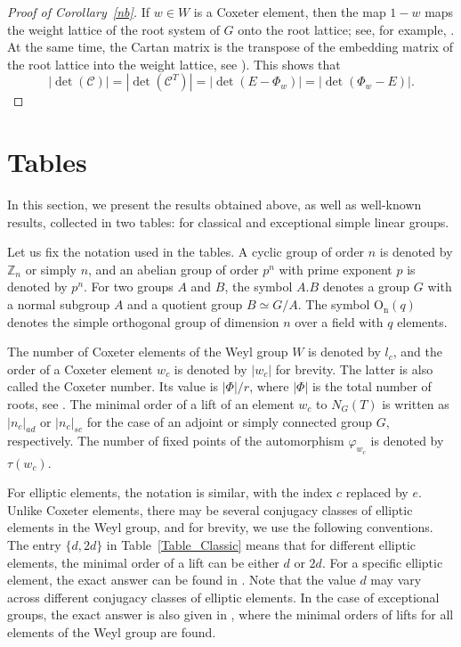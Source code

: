 \documentclass[a4paper,12pt]{amsart}
\theoremstyle{plain}
\theoremstyle{definition}
\begin{document}
\begin{proof}[Proof of Corollary~\ref{nb}]
If $w\in W$ is a Coxeter element, then the map $1-w$ maps the weight lattice of the root system of $G$ onto the root lattice; see, for example, \cite[(VI)$\S$1, ex. 22a)]{Bur}. At the same time, the Cartan matrix is the transpose of the embedding matrix of the root lattice into the weight lattice, see \cite[(VI)$\S$1.10]{Bur}). This shows that
$$
|\det(\mathcal{C})|=|\det(\mathcal{C}^T)|=|\det(E-\Phi_w)|=|\det(\Phi_w-E)|.
$$
\end{proof}

\section{Tables}

In this section, we present the results obtained above, as well as well-known results, collected in two tables: for classical and exceptional simple linear groups.

Let us fix the notation used in the tables. A cyclic group of order $n$ is denoted by $\mathbb{Z}_n$ or simply $n$, and an abelian group of order $p^n$ with prime exponent $p$ is denoted by $p^n$. For two groups $A$ and $B$, the symbol $A.B$ denotes a group $G$ with a normal subgroup $A$ and a quotient group $B \simeq G/A$. The symbol $\operatorname{O_n}(q)$ denotes the simple orthogonal group of dimension $n$ over a field with $q$ elements.

The number of Coxeter elements of the Weyl group $W$ is denoted by $l_c$, and the order of a Coxeter element $w_c$ is denoted by $|w_c|$ for brevity. The latter is also called the Coxeter number. Its value is $|\Phi|/r$, where $|\Phi|$ is the total number of roots, see \cite[Proposition~3.18]{Hum}. The minimal order of a lift of an element $w_c$ to $N_G(T)$ is written as $|n_c|_{ad}$ or $|n_c|_{sc}$ for the case of an adjoint or simply connected group $G$, respectively. The number of fixed points of the automorphism $\varphi_{w_c}$ is denoted by $\tau(w_c)$.

For elliptic elements, the notation is similar, with the index $c$ replaced by $e$. Unlike Coxeter elements, there may be several conjugacy classes of elliptic elements in the Weyl group, and for brevity, we use the following conventions. The entry $\{d,2d\}$ in Table~\ref{Table_Classic} means that for different elliptic elements, the minimal order of a lift can be either $d$ or $2d$. For a specific elliptic element, the exact answer can be found in \cite{Za}. Note that the value $d$ may vary across different conjugacy classes of elliptic elements. In the case of exceptional groups, the exact answer is also given in \cite{Galt_Survey}, where the minimal orders of lifts for all elements of the Weyl group are found.
\end{document}

